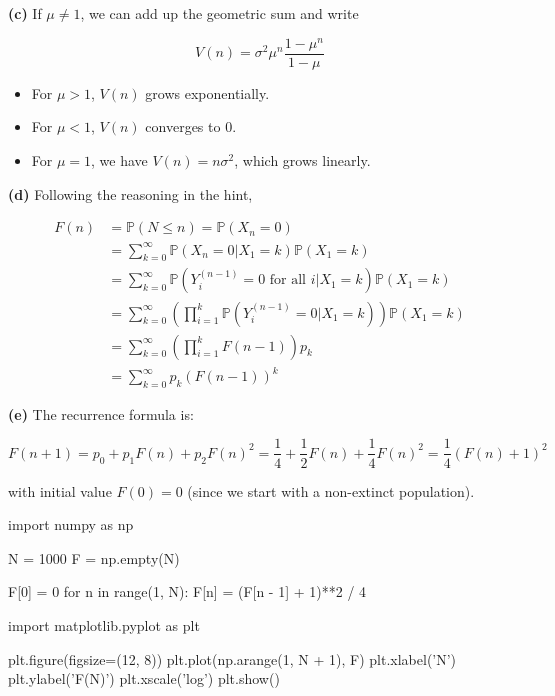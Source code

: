 \textbf{(c)} If \(\mu \neq 1\), we can add up the geometric sum and
write

\[ V(n) = \sigma^2 \mu^n \frac{1 - \mu^{n}}{1 - \mu}\]

\begin{itemize}[tightlist]
\item
  For \(\mu > 1\), \(V(n)\) grows exponentially.\\
\item
  For \(\mu < 1\), \(V(n)\) converges to 0.\\
\item
  For \(\mu = 1\), we have \(V(n) = n \sigma^2\), which grows linearly.
\end{itemize}

\textbf{(d)} Following the reasoning in the hint,

\[
\begin{align}
F(n) &= \mathbb{P}(N \leq n) = \mathbb{P}(X_n = 0) \\
&= \sum_{k=0}^\infty \mathbb{P}(X_n = 0 | X_1 = k) \mathbb{P}(X_1 = k) \\
&= \sum_{k=0}^\infty \mathbb{P}(Y_i^{(n - 1)} = 0 \text{ for all } i | X_1 = k) \mathbb{P}(X_1 = k) \\
&= \sum_{k=0}^\infty \left( \prod_{i=1}^k \mathbb{P}(Y_i^{(n - 1)} = 0 | X_1 = k) \right) \mathbb{P}(X_1 = k) \\
&= \sum_{k=0}^\infty \left( \prod_{i=1}^k F(n-1) \right) p_k \\
&= \sum_{k=0}^\infty p_k \left( F(n - 1)\right)^k
\end{align}
\]

\textbf{(e)} The recurrence formula is:

\[ F(n + 1) = p_0 + p_1 F(n) + p_2 F(n)^2 = \frac{1}{4} + \frac{1}{2} F(n) + \frac{1}{4} F(n)^2 = \frac{1}{4} (F(n) + 1)^2\]

with initial value \(F(0) = 0\) (since we start with a non-extinct
population).

\begin{python}
import numpy as np

N = 1000
F = np.empty(N)

F[0] = 0
for n in range(1, N):
    F[n] = (F[n - 1] + 1)**2 / 4
\end{python}

\begin{python}
import matplotlib.pyplot as plt

plt.figure(figsize=(12, 8))
plt.plot(np.arange(1, N + 1), F)
plt.xlabel('N')
plt.ylabel('F(N)')
plt.xscale('log')
plt.show()
\end{python}


